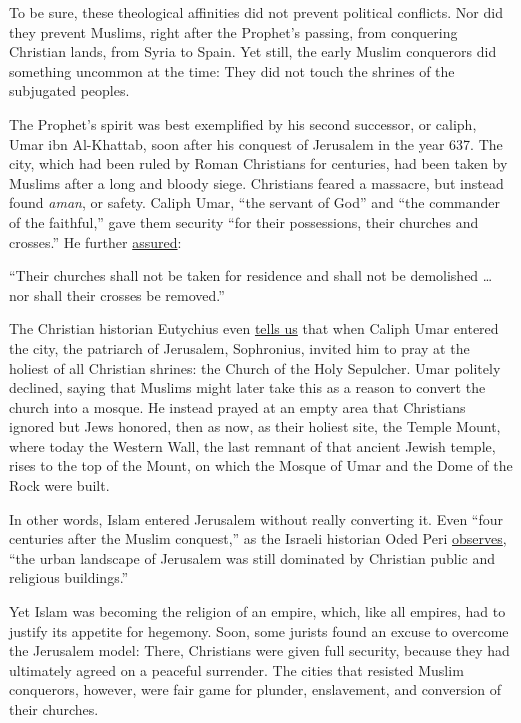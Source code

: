 To be sure, these theological affinities did not prevent political
conflicts. Nor did they prevent Muslims, right after the Prophet's
passing, from conquering Christian lands, from Syria to Spain. Yet
still, the early Muslim conquerors did something uncommon at the time:
They did not touch the shrines of the subjugated peoples.

The Prophet's spirit was best exemplified by his second successor, or
caliph, Umar ibn Al-Khattab, soon after his conquest of Jerusalem in the
year 637. The city, which had been ruled by Roman Christians for
centuries, had been taken by Muslims after a long and bloody siege.
Christians feared a massacre, but instead found \emph{aman}, or safety.
Caliph Umar, ``the servant of God'' and ``the commander of the
faithful,'' gave them security ``for their possessions, their churches
and crosses.'' He further
\href{https://www.amazon.com/dp/B004KKXO0O/ref=dp-kindle-redirect?_encoding=UTF8\&btkr=1}{assured}:

``Their churches shall not be taken for residence and shall not be
demolished \ldots{} nor shall their crosses be removed.''

The Christian historian Eutychius even
\href{https://books.google.com/books?id=nTjRzNwZEWAC\&pg=PA33\&lpg=PA33\&dq=Caliph+Umar+the+Patriarch+of+Jerusalem\&source=bl\&ots=Ysqo-GGhyo\&sig=ACfU3U1FWGR-RnwWq6jn9-7Kdrf7k7OZnw\&hl=en\&sa=X\&ved=2ahUKEwiE-fbJjs3qAhUzYTUKHbLUBFgQ6AEwEXoECAoQAQ\#v=onepage\&q=Caliph\%20Umar\%20the\%20Patriarch\%20of\%20Jerusalem\&f=false}{tells
us} that when Caliph Umar entered the city, the patriarch of Jerusalem,
Sophronius, invited him to pray at the holiest of all Christian shrines:
the Church of the Holy Sepulcher. Umar politely declined, saying that
Muslims might later take this as a reason to convert the church into a
mosque. He instead prayed at an empty area that Christians ignored but
Jews honored, then as now, as their holiest site, the Temple Mount,
where today the Western Wall, the last remnant of that ancient Jewish
temple, rises to the top of the Mount, on which the Mosque of Umar and
the Dome of the Rock were built.

In other words, Islam entered Jerusalem without really converting it.
Even ``four centuries after the Muslim conquest,'' as the Israeli
historian Oded Peri
\href{https://www.jstor.org/stable/3399441?seq=1\#metadata_info_tab_contents}{observes},
``the urban landscape of Jerusalem was still dominated by Christian
public and religious buildings.''

Yet Islam was becoming the religion of an empire, which, like all
empires, had to justify its appetite for hegemony. Soon, some jurists
found an excuse to overcome the Jerusalem model: There, Christians were
given full security, because they had ultimately agreed on a peaceful
surrender. The cities that resisted Muslim conquerors, however, were
fair game for plunder, enslavement, and conversion of their churches.

